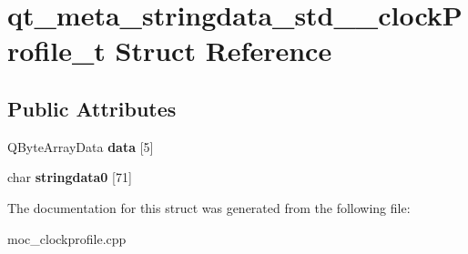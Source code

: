 \hypertarget{structqt__meta__stringdata__std____clockProfile__t}{}\section{qt\+\_\+meta\+\_\+stringdata\+\_\+std\+\_\+\+\_\+clock\+Profile\+\_\+t Struct Reference}
\label{structqt__meta__stringdata__std____clockProfile__t}
\subsection*{Public Attributes}
\begin{DoxyCompactItemize}
\item 
\mbox{\label{structqt__meta__stringdata__std____clockProfile__t_a6c69e7f23550fc82cb5bf666d03d2155}} 
Q\+Byte\+Array\+Data {\bfseries data} \mbox{[}5\mbox{]}
\item 
\mbox{\label{structqt__meta__stringdata__std____clockProfile__t_a3bf7ed65de6e7317e0798a20e4359e37}} 
char {\bfseries stringdata0} \mbox{[}71\mbox{]}
\end{DoxyCompactItemize}


The documentation for this struct was generated from the following file\+:\begin{DoxyCompactItemize}
\item 
moc\+\_\+clockprofile.\+cpp\end{DoxyCompactItemize}
